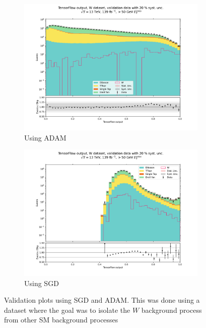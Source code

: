 \documentclass[12pt, a4paper]{book}
\begin{document}
\begin{figure}[!ht]
	\centering
      \begin{subfigure}[b]{0.49\textwidth}
         \centering
         \includegraphics[width=1\textwidth]{Balanced/VAL.pdf}
         \caption{Using ADAM}
      \end{subfigure}
      \begin{subfigure}[b]{0.49\textwidth}
         \centering
         \includegraphics[width=1\textwidth]{SGD/Balanced/VAL.pdf}
         \caption{Using SGD}
      \end{subfigure}
      \caption[Performance comparison between ADAM and SGD optimizer]{Validation plots using SGD and ADAM. 
      This was done using a dataset where the goal was to isolate the $W$ background process from other SM background processes}\label{fig:ADAMvsSGD}
\end{figure}
\end{document}
